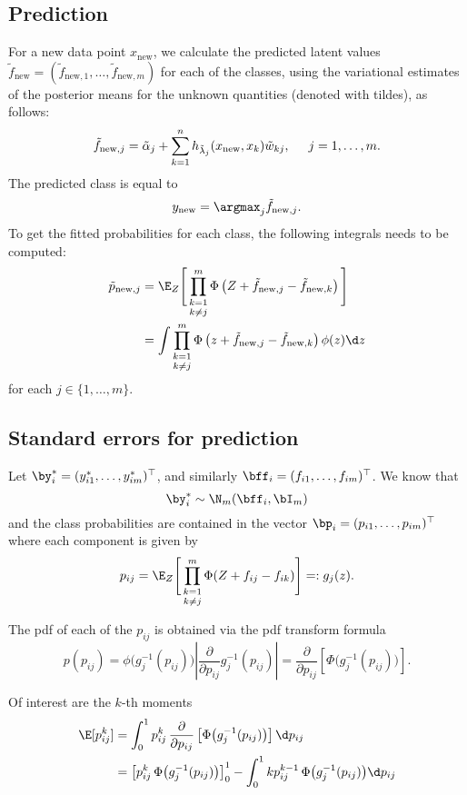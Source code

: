 \subsection{Prediction}

For a new data point $x_{\text{new}}$, we calculate the predicted latent values $\tilde f_{\text{new}} = (\tilde f_{\text{new},1}, \dots, \tilde f_{\text{new},m})$ for each of the classes, using the variational estimates of the posterior means for the unknown quantities (denoted with tildes), as follows:
\[
  \tilde f_{\text{new},j} = \tilde\alpha_j + \sum_{k=1}^n h_{\tilde\lambda_j}(x_{\text{new}}, x_{k})\tilde w_{kj}, \hspace{0.5cm} j = 1,\dots,m.
\]
The predicted class is equal to 
\[
  y_{\text{new}} = \argmax_j \tilde f_{\text{new},j}.
\]
To get the fitted probabilities for each class, the following integrals needs to be computed:
\begin{align*}
  \tilde p_{\text{new},j} 
  &= \E_Z \Bigg[ \mathop{\prod_{k=1}^m}_{k\neq j} \Phi\left(Z + \tilde f_{\text{new},j} - \tilde f_{\text{new},k} \right) \Bigg]  \\
  &= \int \mathop{\prod_{k=1}^m}_{k\neq j} \Phi\left(z + \tilde f_{\text{new},j} - \tilde f_{\text{new},k} \right) \phi(z) \d z
\end{align*}
for each $j \in \{1,\dots, m\}$.

\subsection{Standard errors for prediction}

Let $\by^*_i = (y^*_{i1}, \dots, y^*_{im})^\top$, and similarly $\bff_i = (f_{i1}, \dots, f_{im})^\top$. We know that 
\[
 \by^*_i \sim \N_m(\bff_i, \bI_m)
\]
and the class probabilities are contained in the vector $\bp_i = (p_{i1}, \dots, p_{im})^\top$ where each component is given by
\[
  p_{ij} = \E_Z \Bigg[ \mathop{\prod_{k=1}^m}_{k\neq j} \Phi(Z + f_{ij} - f_{ik}) \Bigg] =: g_j(z).
\]

The pdf of each of the $p_{ij}$ is obtained via the pdf transform formula
\[
  p(p_{ij}) = \phi\big(g_j^{-1}(p_{ij})\big) \left\vert \frac{\partial}{\partial p_{ij}}  g_j^{-1}(p_{ij}) \right\vert 
  = \frac{\partial}{\partial p_{ij}} \left[\Phi\big( g_j^{-1}(p_{ij}) \big) \right].
\]

Of interest are the $k$-th moments
\begin{align*}
  \E[p_{ij}^k] 
  &= \int_0^1 p_{ij}^k \, \frac{\partial}{\partial p_{ij}} \left[\Phi\big( g_j^{-1}(p_{ij}) \big) \right] \d p_{ij} \\
  &= \left[p_{ij}^k \, \Phi\big( g_j^{-1}(p_{ij}) \big) \right]_0^1 
  - \int_0^1 k p_{ij}^{k-1} \, \Phi\big( g_j^{-1}(p_{ij}) \big) \d p_{ij} \\
\end{align*}

